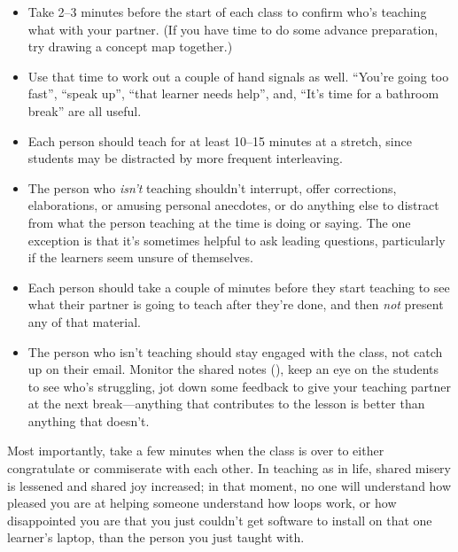 \begin{itemize}

\item
  Take 2--3 minutes before the start of each class to confirm who's
  teaching what with your partner.  (If you have time to do some
  advance preparation, try drawing a concept map together.)

\item
  Use that time to work out a couple of hand signals as well.
  ``You're going too fast'', ``speak up'', ``that learner needs
  help'', and, ``It's time for a bathroom break'' are all useful.

\item
  Each person should teach for at least 10--15 minutes at a stretch,
  since students may be distracted by more frequent interleaving.

\item
  The person who \emph{isn't} teaching shouldn't interrupt, offer
  corrections, elaborations, or amusing personal anecdotes, or do
  anything else to distract from what the person teaching at the time
  is doing or saying.  The one exception is that it's sometimes
  helpful to ask leading questions, particularly if the learners seem
  unsure of themselves.

\item
  Each person should take a couple of minutes before they start
  teaching to see what their partner is going to teach after they're
  done, and then \emph{not} present any of that material.

\item
  The person who isn't teaching should stay engaged with the class,
  not catch up on their email.  Monitor the shared notes
  (), keep an eye on the students to
  see who's struggling, jot down some feedback to give your teaching
  partner at the next break---anything that contributes to the lesson
  is better than anything that doesn't.

\end{itemize}

Most importantly, take a few minutes when the class is over to either
congratulate or commiserate with each other.  In teaching as in life,
shared misery is lessened and shared joy increased; in that moment,
no one will understand how pleased you are at helping someone
understand how loops work, or how disappointed you are that you just
couldn't get software to install on that one learner's laptop, than
the person you just taught with.

